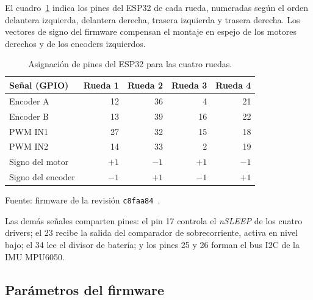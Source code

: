 El cuadro~\ref{tab:pines-esp32} indica los pines del ESP32 de cada rueda, numeradas según el orden delantera izquierda, delantera derecha, trasera izquierda y trasera derecha. Los vectores de signo del firmware compensan el montaje en espejo de los motores derechos y de los encoders izquierdos.

\begin{table}[htbp]
\centering\small
\setlength{\tabcolsep}{5pt}
\caption{Asignación de pines del ESP32 para las cuatro ruedas.}\label{tab:pines-esp32}
\begin{tabular}{lrrrr}
\toprule
Señal (GPIO) & Rueda 1 & Rueda 2 & Rueda 3 & Rueda 4\\\midrule
Encoder A & 12 & 36 & 4 & 21\\
Encoder B & 13 & 39 & 16 & 22\\
PWM IN1 & 27 & 32 & 15 & 18\\
PWM IN2 & 14 & 33 & 2 & 19\\
Signo del motor & $+1$ & $-1$ & $+1$ & $-1$\\
Signo del encoder & $-1$ & $+1$ & $-1$ & $+1$\\
\bottomrule
\end{tabular}
\par\smallskip\small Fuente: firmware de la revisión \texttt{c8faa84}~\cite{repoMartha}.
\end{table}

Las demás señales comparten pines: el pin 17 controla el \emph{nSLEEP} de los cuatro drivers; el 23 recibe la salida del comparador de sobrecorriente, activa en nivel bajo; el 34 lee el divisor de batería; y los pines 25 y 26 forman el bus I2C de la IMU MPU6050.

\subsection{Parámetros del firmware}

